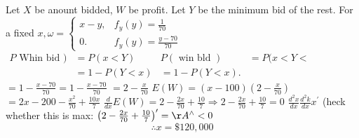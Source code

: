 Let $X$ be anount bidded, $W$ be profit. Let $Y$ be the minimum bid of the rest.
For a fixed $x, \omega=\left\{\begin{array}{lll}x-y, & f_{y}(y)=\frac{1}{70} \\ 0 . & f_{y}(y)=\frac{y-70}{70}\end{array}\right.$
$\begin{aligned}P \text { Whin bid }) &=P(x<Y) & P(\text { win bld }) &=P(x<Y<\\ &=1-P(Y<x) &=1-P(Y<x) . \end{aligned}$
$=1-\frac{x-70}{70}=1-\frac{x-70}{70}$
$=2-\frac{x}{70}$
$E(W)=(x-100)\left(2-\frac{x}{70}\right)$
$=2 x-200-\frac{x^{2}}{70}+\frac{10 x}{7}$
$\frac{d}{d x} E(W)=2-\frac{2 x}{70}+\frac{10}{7} \Rightarrow 2-\frac{2 x}{70}+\frac{10}{7}=0$
$\frac{d^{2} x}{d x} \frac{d^{2} k}{d x} x^{\prime}$ (heck whether this is max: $\left(2-\frac{2 x}{70}+\frac{10}{7}\right)^{\prime}=\AA^{\wedge}<0$
\[
\therefore x=\$ 120,000
\]